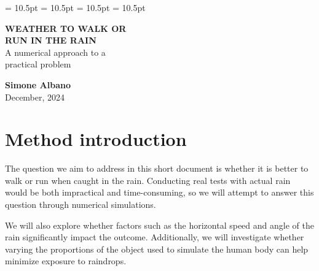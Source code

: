 \documentclass[12pt]{report}
\begin{document}
    \onehalfspacing

    \abovedisplayskip = 10.5pt
    \abovedisplayshortskip = 10.5pt
    \belowdisplayskip = 10.5pt
    \belowdisplayshortskip = 10.5pt


    \setlength{\jot}{12pt} %

    \begin{titlepage}
        \vspace*{\fill}
        \begin{center}
            \LARGE
            \textbf{\uppercase{weather to walk or\\run in the rain}}\\
            \vspace{30pt}
            \Large
            A numerical approach to a \\practical problem\\
        \end{center}
        \vspace{300pt}
        \begin{center}
            \large
            \textbf{Simone Albano}\\
            December, 2024
        \end{center}
        \vspace*{\fill}
    \end{titlepage}

    \newpage

    \chapter{Method introduction}
    The question we aim to address in this short document is whether it is better to walk or run when caught in the rain. Conducting real tests with actual rain would be both impractical and time-consuming, so we will attempt to answer this question through numerical simulations.

    We will also explore whether factors such as the horizontal speed and angle of the rain significantly impact the outcome. Additionally, we will investigate whether varying the proportions of the object used to simulate the human body can help minimize exposure to raindrops.
\end{document}
